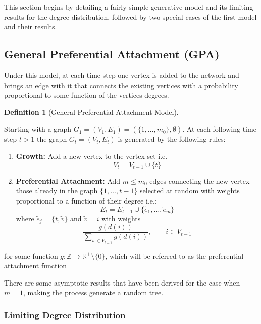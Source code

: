 \documentclass[
  10pt,
  a4paper,
]{scrreprt}
\providecommand{\tightlist}{%
  \setlength{\itemsep}{0pt}\setlength{\parskip}{0pt}}\usepackage{longtable,booktabs,array}
\theoremstyle{plain}
\theoremstyle{plain}
\theoremstyle{definition}
\newtheorem{definition}{Definition}[section]
\theoremstyle{plain}
\theoremstyle{remark}
\begin{document}
{This section begins by detailing a fairly simple generative model and
its limiting results for the degree distribution, followed by two
special cases of the first model and their results.

\hypertarget{general-preferential-attachment-gpa}{%
\subsection{General Preferential Attachment
(GPA)}\label{general-preferential-attachment-gpa}}

Under this model, at each time step one vertex is added to the network
and brings an edge with it that connects the existing vertices with a
probability proportional to some function of the vertices degrees.

\begin{definition}[General Preferential Attachment
Model]\protect\hypertarget{def-gpa}{}\label{def-gpa}

Starting with a graph
\(G_1 = (V_1, E_1) = (\{1,\ldots,m_0\}, \emptyset)\). At each following
time step \(t>1\) the graph \(G_t = (V_t, E_t)\) is generated by the
following rules:

\begin{enumerate}
\def\labelenumi{\arabic{enumi}.}
\tightlist
\item
  \textbf{Growth:} Add a new vertex to the vertex set i.e.~\[
  V_t = V_{t-1} \cup \{t\}
  \]
\item
  \textbf{Preferential Attachment:} Add \(m\le m_0\) edges connecting
  the new vertex those already in the graph \(\{1,\ldots,t-1\}\)
  selected at random with weights proportional to a function of their
  degree i.e.: \[
  E_t  = E_{t-1} \cup \{\tilde e_1,\ldots,\tilde e_m\}
  \] where \(\tilde e_j = \{t,\tilde v\}\) and \(\tilde v = i\) with
  weights \[
  \displaystyle\frac{g(d(i))}{\sum_{w\in V_{t-1}} g(d(i))}, \qquad i\in V_{t-1}
  \]
\end{enumerate}

for some function \(g: \mathbb Z \mapsto \mathbb R^+\setminus\{0\}\),
which will be referred to as the preferential attachment function

\end{definition}

There are some asymptotic results that have been derived for the case
when \(m=1\), making the process generate a random tree.

\hypertarget{limiting-degree-distribution}{%
\subsubsection{Limiting Degree
Distribution}\label{limiting-degree-distribution}}

}
\end{document}
